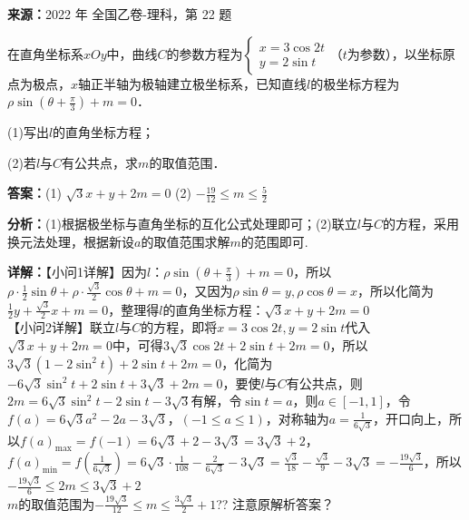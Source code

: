 \begin{question}[points=10]
\textbf{来源：}2022 年 全国乙卷-理科，第 22 题\par
[选修4-4：坐标系与参数方程]

在直角坐标系$xOy$中，曲线$C$的参数方程为$\begin{cases} x = 3\cos 2t \\ y = 2\sin t \end{cases}$（$t$为参数），以坐标原点为极点，$x$轴正半轴为极轴建立极坐标系，已知直线$l$的极坐标方程为$\rho\sin\left(\theta+\frac{\pi}{3}\right)+m=0$．

(1)写出$l$的直角坐标方程；

(2)若$l$与$C$有公共点，求$m$的取值范围．
\begin{solution}
\textbf{答案：}(1) $\sqrt{3}x+y+2m=0$
(2) $-\frac{19}{12}\leq m\leq \frac{5}{2}$

\textbf{分析：}(1)根据极坐标与直角坐标的互化公式处理即可；(2)联立$l$与$C$的方程，采用换元法处理，根据新设$a$的取值范围求解$m$的范围即可.

\textbf{详解：}【小问1详解】因为$l$：$\rho\sin\left(\theta+\frac{\pi}{3}\right)+m=0$，所以$\rho\cdot\frac{1}{2}\sin\theta + \rho\cdot\frac{\sqrt{3}}{2}\cos\theta + m = 0$，又因为$\rho\sin\theta=y, \rho\cos\theta=x$，所以化简为$\frac{1}{2}y+\frac{\sqrt{3}}{2}x+m=0$，整理得$l$的直角坐标方程：$\sqrt{3}x+y+2m=0$\\【小问2详解】联立$l$与$C$的方程，即将$x=3\cos2t, y=2\sin t$代入$\sqrt{3}x+y+2m=0$中，可得$3\sqrt{3}\cos2t+2\sin t+2m=0$，所以$3\sqrt{3}(1-2\sin^2t)+2\sin t+2m=0$，化简为$-6\sqrt{3}\sin^2t+2\sin t+3\sqrt{3}+2m=0$，要使$l$与$C$有公共点，则$2m=6\sqrt{3}\sin^2t-2\sin t-3\sqrt{3}$有解，令$\sin t=a$，则$a\in[-1,1]$，令$f(a)=6\sqrt{3}a^2-2a-3\sqrt{3}$，$(-1\leq a\leq 1)$，对称轴为$a=\frac{1}{6\sqrt{3}}$，开口向上，所以$f(a)_{\max}=f(-1)=6\sqrt{3}+2-3\sqrt{3}=3\sqrt{3}+2$，\\$f(a)_{\min}=f\left(\frac{1}{6\sqrt{3}}\right)=6\sqrt{3}\cdot\frac{1}{108}-\frac{2}{6\sqrt{3}}-3\sqrt{3}=\frac{\sqrt{3}}{18}-\frac{\sqrt{3}}{9}-3\sqrt{3}=-\frac{19\sqrt{3}}{6}$，所以$-\frac{19\sqrt{3}}{6}\leq 2m\leq 3\sqrt{3}+2$\\$m$的取值范围为$-\frac{19\sqrt{3}}{12}\leq m\leq \frac{3\sqrt{3}}{2}+1$?? 注意原解析答案？
\end{solution}
\end{question}

